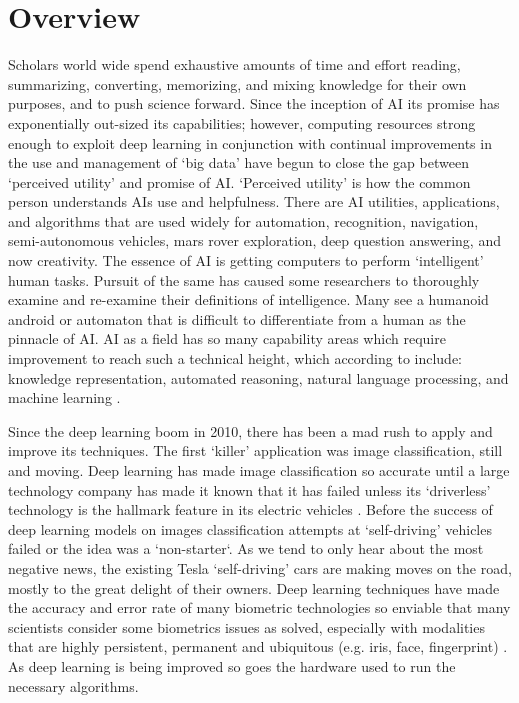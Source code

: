 \section{Overview}


\noindent Scholars world wide spend exhaustive amounts of time and effort reading, summarizing, converting, memorizing, and mixing knowledge for their own purposes, and to push science forward.
Since the inception of AI its promise has exponentially out-sized its capabilities; however, computing resources strong enough to exploit deep learning in conjunction with continual improvements in the use and management of `big data' have begun to close the gap between `perceived utility' and promise of AI.
`Perceived utility' is how the common person understands AIs use and helpfulness.
There are AI utilities, applications, and algorithms that are used widely for automation, recognition, navigation, semi-autonomous vehicles, mars rover exploration, deep question answering, and now creativity.
The essence of AI is getting computers to perform `intelligent' human tasks.
Pursuit of the same has caused some researchers to thoroughly examine and re-examine their definitions of intelligence.
Many see a humanoid android or automaton that is difficult to differentiate from a human as the pinnacle of AI. 
AI as a field has so many capability areas which require improvement to reach such a technical height, which according to \cite{RussellNorvig:2016} include: knowledge representation, automated reasoning, natural language processing, and machine learning  
\cite{Azaria:2022,DePeau-Wilson:2023,Foucart:2023,Zhang:2023}.


Since the deep learning boom in 2010, there has been a mad rush to apply and improve its techniques.
The first `killer' application was image classification, still and moving.
Deep learning has made image classification so accurate until a large technology company has made it known that it has failed unless its `driverless' technology is the hallmark feature in its electric vehicles . 
Before the success of deep learning models on images classification attempts at `self-driving' vehicles failed or the idea was a `non-starter`.
As we tend to only hear about the most negative news, the existing Tesla `self-driving' cars are making moves on the road, mostly to the great delight of their owners.
Deep learning techniques have made the accuracy and error rate of many biometric technologies so enviable that many scientists consider some biometrics issues as solved, especially with modalities that are highly persistent, permanent and ubiquitous (e.g. iris, face, fingerprint) .
As deep learning is being improved so goes the hardware used to run the necessary algorithms.

